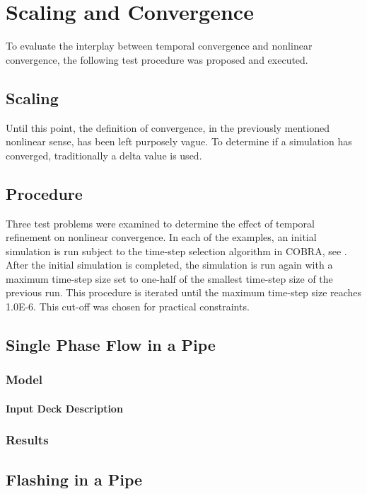 \chapter{Scaling and Convergence}
\label{chap:scaling_and_convergence}
To evaluate the interplay between temporal convergence and nonlinear convergence, the following test procedure was proposed and executed.

\section{Scaling}
Until this point, the definition of convergence, in the previously mentioned nonlinear sense, has been left purposely vague.
To determine if a simulation has converged, traditionally a delta value is used.



\section{Procedure}
Three test problems were examined to determine the effect of temporal refinement on nonlinear convergence.
In each of the examples, an initial simulation is run subject to the time-step selection algorithm in COBRA, see .
After the initial simulation is completed, the simulation is run again with a maximum time-step size set to one-half of the smallest time-step size of the previous run.
This procedure is iterated until the maximum time-step size reaches 1.0E-6.
This cut-off was chosen for practical constraints.

\section{Single Phase Flow in a Pipe}
\subsection{Model}
\subsubsection{Input Deck Description}
\subsection{Results}

\section{Flashing in a Pipe}
